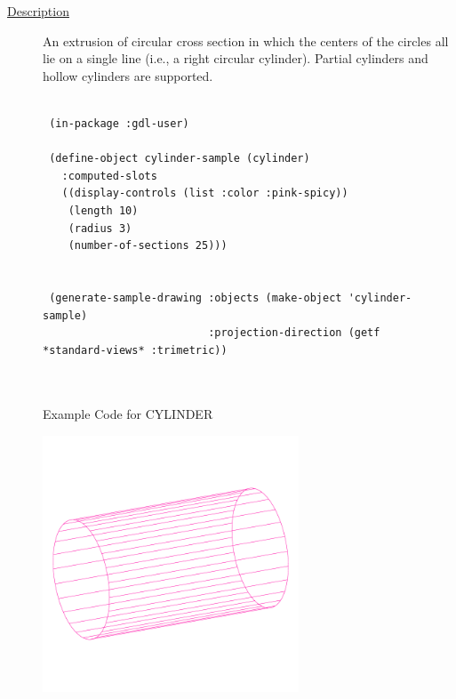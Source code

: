 \documentclass [11pt]{book}
\begin{document}
\begin{itemize}
\begin{description}
\item [
\underline{Description}]


An extrusion of circular cross section in which the 
centers of the circles all lie on a single line (i.e., a right circular cylinder).
Partial cylinders and hollow cylinders are supported.



\end{description}




\begin{figure}
\begin{lrbox}{\boxedverb}
\begin{minipage}{\linewidth}
{\small

\begin{verbatim}

 (in-package :gdl-user)

 (define-object cylinder-sample (cylinder)
   :computed-slots
   ((display-controls (list :color :pink-spicy))
    (length 10)
    (radius 3)
    (number-of-sections 25)))


 (generate-sample-drawing :objects (make-object 'cylinder-sample)
                          :projection-direction (getf *standard-views* :trimetric))
   


\end{verbatim}}
\end{minipage}
\end{lrbox}
\fbox{\usebox{\boxedverb}}

\caption{Example Code for CYLINDER}

\label{fig:example-code-CYLINDER}

\end{figure}

\begin{figure}
\begin{center}
\includegraphics[width=3in,height=3in]{../images/example-CYLINDER.pdf}
\end{center}


\end{figure}
\end{itemize}
\end{document}
